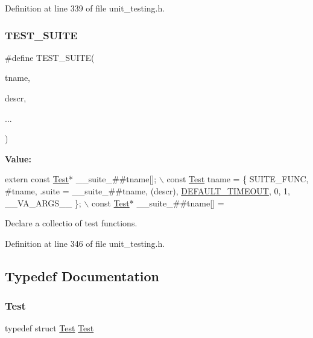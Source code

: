 Definition at line 339 of file unit\+\_\+testing.\+h.

\mbox{\label{group__Testing_ga3e52396e466caa8cba74e1ae603817d3}} 
\subsubsection{\texorpdfstring{T\+E\+S\+T\+\_\+\+S\+U\+I\+TE}{TEST\_SUITE}}
{\footnotesize\ttfamily \#define T\+E\+S\+T\+\_\+\+S\+U\+I\+TE(\begin{DoxyParamCaption}\item[{}]{tname,  }\item[{}]{descr,  }\item[{}]{... }\end{DoxyParamCaption})}

{\bfseries Value\+:}
\begin{DoxyCode}
\textcolor{keyword}{extern} \textcolor{keyword}{const} \hyperlink{structTest}{Test}* \_\_suite\_##tname[]; \(\backslash\)
const \hyperlink{structTest}{Test} tname  = \{ SUITE\_FUNC, #tname, .suite = \_\_suite\_##tname, (descr), 
      \hyperlink{group__Testing_gaad2dd72565852b91c809cd4685833b17}{DEFAULT\_TIMEOUT}, 0, 1, \_\_VA\_ARGS\_\_ \}; \(\backslash\)
const \hyperlink{structTest}{Test}* \_\_suite\_##tname[]  =
\end{DoxyCode}


Declare a collectio of test functions. 



Definition at line 346 of file unit\+\_\+testing.\+h.



\subsection{Typedef Documentation}
\mbox{\label{group__Testing_ga8900225cc98bb7c7fb170b8694e1f7a4}} 
\subsubsection{\texorpdfstring{Test}{Test}}
{\footnotesize\ttfamily typedef struct \hyperlink{structTest}{Test}  \hyperlink{structTest}{Test}}



